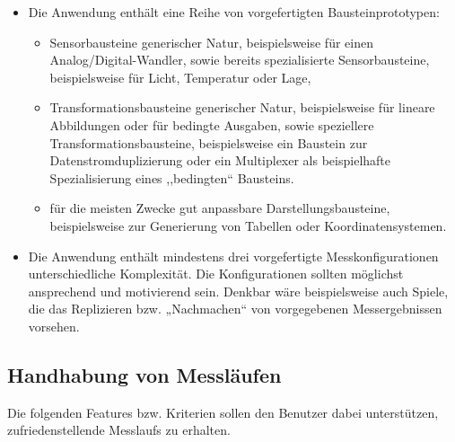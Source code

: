 \documentclass[parskip=full]{scrartcl}
\begin{document}
\begin{itemize}
	
	\item Die Anwendung enthält eine Reihe von vorgefertigten Bausteinprototypen: 
	\begin{itemize}
		
		\item 
		\begin{MussKrit} 		
			Sensorbausteine generischer Natur, beispielsweise für einen Analog/Digital-Wandler, sowie bereits spezialisierte Sensorbausteine, beispielsweise für Licht, Temperatur oder Lage,	
		\end{MussKrit} 
		
		\item 
		\begin{MussKrit} 		
			Transformationsbausteine generischer Natur, beispielsweise für lineare Abbildungen oder für bedingte Ausgaben, sowie speziellere Transformationsbausteine, beispielsweise ein Baustein zur Datenstromduplizierung oder ein Multiplexer als beispielhafte Spezialisierung eines ,,bedingten`` Bausteins. 
				
		\end{MussKrit}
		
		\item 
		\begin{MussKrit} 	
			für die meisten Zwecke gut anpassbare Darstellungsbausteine, beispielsweise zur Generierung von Tabellen oder Koordinatensystemen.					
		\end{MussKrit}
	\end{itemize}
	
	\item 
	\begin{MussKrit} 
		Die Anwendung enthält mindestens drei vorgefertigte Messkonfigurationen unterschiedliche Komplexität. Die Konfigurationen sollten möglichst ansprechend und motivierend sein. Denkbar wäre beispielsweise auch Spiele, die das Replizieren bzw. „Nachmachen“ von vorgegebenen Messergebnissen vorsehen.			
	\end{MussKrit}
	
\end{itemize}


\subsection{Handhabung von Messläufen}

Die folgenden Features bzw. Kriterien sollen den Benutzer dabei unterstützen, zufriedenstellende \glspl{Messlauf} zu erhalten.
\end{document}
